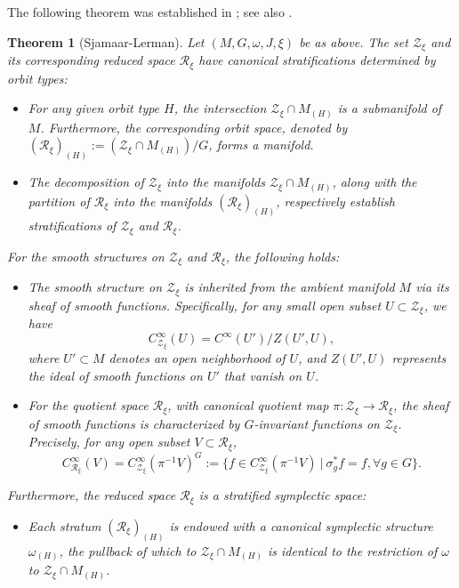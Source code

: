 \documentclass[12pt]{amsart}
\newtheorem{theorem}{Theorem}[section]
\theoremstyle{definition}
\numberwithin{equation}{section}
\newcommand{\Cinf}{C^\infty}
\newcommand{\Zxi}{\mathcal{Z}_{\xi}}
\newcommand{\Reducedxi}{\mathcal{R}_\xi}
\newcommand{\SET}[1]{\{#1\}}
\begin{document}
	The following   theorem was established in \cite{SLannals};  see also   \cite{BatesLerman1997,Pflaumbook}.
	\begin{theorem}[Sjamaar-Lerman]\label{Thm:SLReduced}
		Let $(M,G,\omega,J,\xi)$ be   as above. The   set $\Zxi$ and its corresponding reduced space $\Reducedxi$ have canonical stratifications determined by orbit types:
		
		\begin{itemize}
			\item[(1)] For any given orbit type $H$, the intersection $\Zxi\cap M_{(H)}$ is a submanifold of $M$. Furthermore, the corresponding orbit space, denoted by $(\Reducedxi)_{(H)}:=(\Zxi\cap M_{(H)})/G$, forms a manifold.
			
			\item[(2)] The decomposition of $\Zxi$ into the manifolds $\Zxi\cap M_{(H)}$, along with the partition of $\Reducedxi$ into the manifolds $(\Reducedxi)_{(H)}$, respectively establish stratifications of $\Zxi$ and $\Reducedxi$.
		\end{itemize}
		
		
		For the smooth structures on $\Zxi$ and $\Reducedxi$,  the following holds:
		
		\begin{itemize}
			\item[(3)] The smooth structure on $\Zxi$ is inherited from the  ambient manifold $M$ via its sheaf of smooth functions. Specifically, for any small open subset $U\subset \Zxi$, we have
			$$\Cinf_{\Zxi}(U)= \Cinf (U') / Z(U',U),$$
			where $U'\subset M$ denotes an open neighborhood of $U$, and $Z(U',U)$ represents the ideal of smooth functions on $U'$ that vanish on $U$.
			
			\item[(4)] For the quotient space $\Reducedxi$, with canonical quotient map $\pi:\Zxi\to \Reducedxi$, the sheaf of smooth functions is characterized by $G$-invariant functions on $\Zxi$. Precisely, for any open subset $V\subset \Reducedxi$,
			$$\Cinf_{\Reducedxi}(V)=\Cinf_{\Zxi}(\pi^{-1}V)^G:=\SET{f\in \Cinf_{\Zxi}(\pi^{-1}V)~|~ \sigma_g^* f=f,\forall g\in G}.$$
		\end{itemize}
		
		
		Furthermore, the reduced space $\Reducedxi$ is a stratified symplectic space:
		
		\begin{itemize}
			\item[(5)] Each stratum $(\Reducedxi)_{(H)}$ is endowed with a canonical symplectic structure $\omega_{(H)}$, the pullback of which to $\Zxi\cap M_{(H)}$ is identical to the restriction of $\omega$ to $\Zxi\cap M_{(H)}$.
			

\end{itemize}
\end{theorem}
\end{document}
